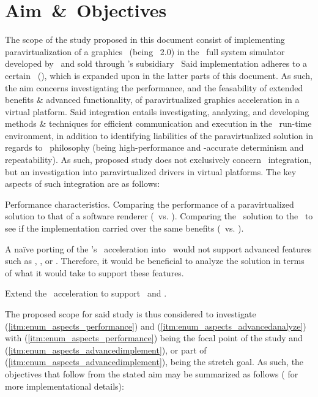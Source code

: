 
\chapter{Aim~\&~Objectives}
\label{cha:aimandobjectives}
The scope of the study proposed in this document consist of implementing paravirtualization of a graphics \termapi\ (being \termopengles ~2.0) in the \termsimics\ full system simulator developed by \termintel\ and sold through \termintel 's subsidiary \termwindriver\ 
Said implementation adheres to a certain \termrefimpl\ (), which is expanded upon in the latter parts of this document.
As such, the aim concerns investigating the performance, and the feasability of extended benefits \& advanced functionality, of paravirtualized graphics acceleration in a virtual platform. Said integration entails investigating, analyzing, and developing methods \& techniques for efficient communication and execution in the \termsimics\ run-time environment, in addition to identifying liabilities of the paravirtualized solution in regards to \termsimics\ philosophy (being high-performance and \termtiming -accurate determinism and repeatability). As such, proposed study does not exclusively concern \termsimics\ integration, but an investigation into paravirtualized drivers in virtual platforms.
The key aspects of such integration are as follows:
\begin{enumerate*}
	\item \label{itm:enum_aspects_performance} Performance characteristics.
	Comparing the performance of a paravirtualized solution to that of a software renderer (\termsimics\ vs. \termsimics ).
	Comparing the \termsimics\ solution to the \termrefsolu\ to see if the implementation carried over the same benefits (\termsimics\ vs. \termrefsolu ).
	\item \label{itm:enum_aspects_advancedanalyze} A naïve porting of the \termrefimpl 's \termopengles\ acceleration into \termsimics\ would not support advanced features such as \termdetexe , \termcheckpointing , or \termrevexe .
	Therefore, it would be beneficial to analyze the solution in terms of what it would take to support these features.
	\item \label{itm:enum_aspects_advancedimplement} Extend the \termopengles\ acceleration to support \termcheckpointing\ and \termrevexe .
\end{enumerate*}
The proposed scope for said study is thus considered to investigate (\ref{itm:enum_aspects_performance}) and (\ref{itm:enum_aspects_advancedanalyze}) with (\ref{itm:enum_aspects_performance}) being the focal point of the study and (\ref{itm:enum_aspects_advancedimplement}), or part of (\ref{itm:enum_aspects_advancedimplement}), being the stretch goal.
As such, the objectives that follow from the stated aim may be summarized as follows (\dvcmdrefsee{\dvcmdrefcha{cha:researchmethodology}} for more implementational details):

